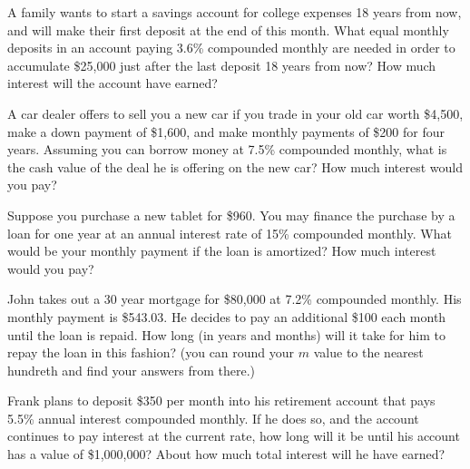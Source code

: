 \documentclass[11pt,epsfig]{article}
\begin{document}
\newpage

\begin{problem}{12}
A family wants to start a savings account for college expenses 18 years from now, and will make their first deposit at the end of this month. What equal monthly deposits in an account paying 3.6\% compounded monthly are needed in order to accumulate \$25,000 just after the last deposit 18 years from now? How much interest will the account have earned?  

\vfill
\end{problem}

\begin{problem}{12}
A car dealer offers to sell you a new car if you trade in your old car worth \$4,500, make a down payment of \$1,600, and make monthly payments of \$200 for four years. Assuming you can borrow money at 7.5\% compounded monthly, what is the cash value of the deal he is offering on the new car? How much interest would you pay?
  
\vfill
\end{problem}


\newpage


\begin{problem}{12}
Suppose you purchase a new tablet for \$960. You may finance the purchase by a loan for one year at an annual interest rate of 15\% compounded monthly. What would be your monthly payment if the loan is amortized? How much interest would you pay?

\vfill
\end{problem}

\begin{problem}{12}
John takes out a 30 year mortgage for \$80,000 at 7.2\% compounded monthly. His monthly payment is \$543.03. He decides to pay an additional \$100 each month until the loan is repaid. How long (in years and months) will it take for him to repay the loan in this fashion? (you can round your $m$ value to the nearest hundreth and find your answers from there.)


\vfill
\end{problem}

\newpage

\begin{problem}{12}
Frank plans to deposit \$350 per month into his retirement account that pays 5.5\% annual interest compounded monthly. If he does so, and the account continues to pay interest at the current rate, how long will it be until his account has a value of \$1,000,000? About how much total interest will he have earned?

\vfill
\end{problem}
\end{document}
